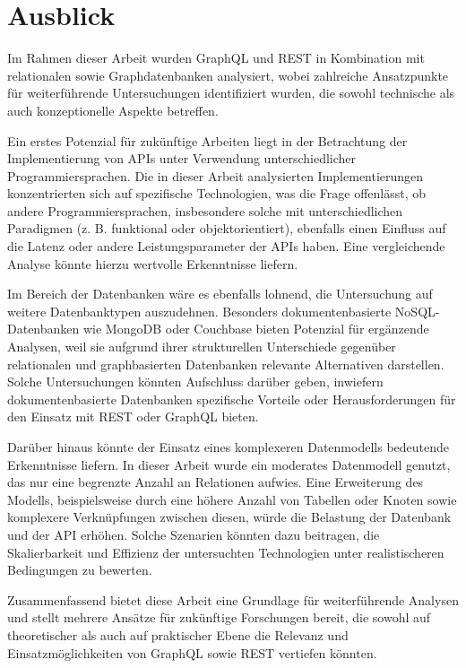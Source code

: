 \chapter{Ausblick} %
\label{sec:ausblick}
Im Rahmen dieser Arbeit wurden GraphQL und REST in Kombination mit relationalen sowie Graphdatenbanken analysiert, wobei zahlreiche Ansatzpunkte für weiterführende Untersuchungen identifiziert wurden, die sowohl technische als auch konzeptionelle Aspekte betreffen.

\noindent
Ein erstes Potenzial für zukünftige Arbeiten liegt in der Betrachtung der Implementierung von APIs unter Verwendung unterschiedlicher Programmiersprachen. Die in dieser Arbeit analysierten Implementierungen konzentrierten sich auf spezifische Technologien, was die Frage offenlässt, ob andere Programmiersprachen, insbesondere solche mit unterschiedlichen Paradigmen (z. B. funktional oder objektorientiert), ebenfalls einen Einfluss auf die Latenz oder andere Leistungsparameter der APIs haben. Eine vergleichende Analyse könnte hierzu wertvolle Erkenntnisse liefern.

\noindent
Im Bereich der Datenbanken wäre es ebenfalls lohnend, die Untersuchung auf weitere Datenbanktypen auszudehnen. Besonders dokumentenbasierte NoSQL-Datenbanken wie MongoDB oder Couchbase bieten Potenzial für ergänzende Analysen, weil sie aufgrund ihrer strukturellen Unterschiede gegenüber relationalen und graphbasierten Datenbanken relevante Alternativen darstellen. Solche Untersuchungen könnten Aufschluss darüber geben, inwiefern dokumentenbasierte Datenbanken spezifische Vorteile oder Herausforderungen für den Einsatz mit REST oder GraphQL bieten.

\noindent
Darüber hinaus könnte der Einsatz eines komplexeren Datenmodells bedeutende Erkenntnisse liefern. In dieser Arbeit wurde ein moderates Datenmodell genutzt, das nur eine begrenzte Anzahl an Relationen aufwies. Eine Erweiterung des Modells, beispielsweise durch eine höhere Anzahl von Tabellen oder Knoten sowie komplexere Verknüpfungen zwischen diesen, würde die Belastung der Datenbank und der API erhöhen. Solche Szenarien könnten dazu beitragen, die Skalierbarkeit und Effizienz der untersuchten Technologien unter realistischeren Bedingungen zu bewerten.

\noindent
Zusammenfassend bietet diese Arbeit eine Grundlage für weiterführende Analysen und stellt mehrere Ansätze für zukünftige Forschungen bereit, die sowohl auf theoretischer als auch auf praktischer Ebene die Relevanz und Einsatzmöglichkeiten von GraphQL sowie REST vertiefen könnten.


